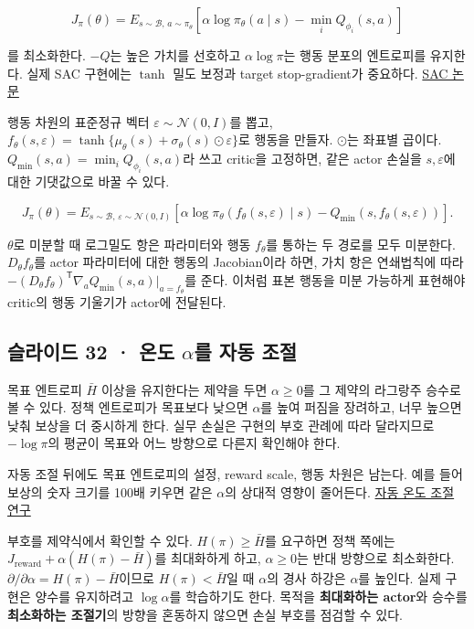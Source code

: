 \documentclass[11pt,a4paper]{article}
\begin{document}
\[
J_\pi(\theta)=E_{s\sim\mathcal B,\,a\sim\pi_\theta}
[\alpha\log\pi_\theta(a\mid s)-\min_iQ_{\phi_i}(s,a)]
\]

를 최소화한다. $-Q$는 높은 가치를 선호하고 $\alpha\log\pi$는 행동 분포의 엔트로피를 유지한다. 실제 SAC 구현에는 $\tanh$ 밀도 보정과 target stop-gradient가 중요하다. \href{https://arxiv.org/abs/1801.01290}{SAC 논문}\par

행동 차원의 표준정규 벡터 $\varepsilon\sim\mathcal N(0,I)$를 뽑고, $f_\theta(s,\varepsilon)=\tanh\{\mu_\theta(s)+\sigma_\theta(s)\odot\varepsilon\}$로 행동을 만들자. $\odot$는 좌표별 곱이다. $Q_{\min}(s,a)=\min_iQ_{\phi_i}(s,a)$라 쓰고 critic을 고정하면, 같은 actor 손실을 $s,\varepsilon$에 대한 기댓값으로 바꿀 수 있다.\par

\[
J_\pi(\theta)=E_{s\sim\mathcal B,\,\varepsilon\sim\mathcal N(0,I)}
\left[\alpha\log\pi_\theta(f_\theta(s,\varepsilon)\mid s)
-Q_{\min}(s,f_\theta(s,\varepsilon))\right].
\]

$\theta$로 미분할 때 로그밀도 항은 파라미터와 행동 $f_\theta$를 통하는 두 경로를 모두 미분한다. $D_\theta f_\theta$를 actor 파라미터에 대한 행동의 Jacobian이라 하면, 가치 항은 연쇄법칙에 따라 $-(D_\theta f_\theta)^\mathsf T\nabla_aQ_{\min}(s,a)|_{a=f_\theta}$를 준다. 이처럼 표본 행동을 미분 가능하게 표현해야 critic의 행동 기울기가 actor에 전달된다.\par

\subsection{슬라이드 32 · 온도 $\alpha$를 자동 조절}

목표 엔트로피 $\bar H$ 이상을 유지한다는 제약을 두면 $\alpha\ge0$를 그 제약의 라그랑주 승수로 볼 수 있다. 정책 엔트로피가 목표보다 낮으면 $\alpha$를 높여 퍼짐을 장려하고, 너무 높으면 낮춰 보상을 더 중시하게 한다. 실무 손실은 구현의 부호 관례에 따라 달라지므로 $-\log\pi$의 평균이 목표와 어느 방향으로 다른지 확인해야 한다.\par

자동 조절 뒤에도 목표 엔트로피의 설정, reward scale, 행동 차원은 남는다. 예를 들어 보상의 숫자 크기를 100배 키우면 같은 $\alpha$의 상대적 영향이 줄어든다. \href{https://arxiv.org/abs/1812.05905}{자동 온도 조절 연구}\par

부호를 제약식에서 확인할 수 있다. $H(\pi)\ge\bar H$를 요구하면 정책 쪽에는 $J_{\mathrm{reward}}+\alpha(H(\pi)-\bar H)$를 최대화하게 하고, $\alpha\ge0$는 반대 방향으로 최소화한다. $\partial/\partial\alpha=H(\pi)-\bar H$이므로 $H(\pi)<\bar H$일 때 $\alpha$의 경사 하강은 $\alpha$를 높인다. 실제 구현은 양수를 유지하려고 $\log\alpha$를 학습하기도 한다. 목적을 \textbf{최대화하는 actor}와 승수를 \textbf{최소화하는 조절기}의 방향을 혼동하지 않으면 손실 부호를 점검할 수 있다.\par
\end{document}
